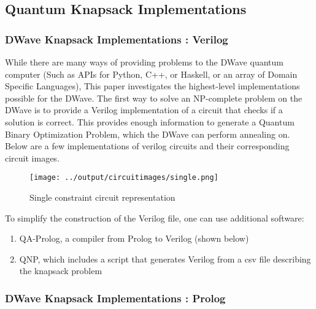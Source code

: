 \documentclass{article}
\begin{document}
\lstset{language=Python}

\newpage

\subsection{Quantum Knapsack Implementations}

\subsubsection{DWave Knapsack Implementations : Verilog}

While there are many ways of providing problems to the DWave quantum computer (Such as APIs for Python, C++, or Haskell, or an array of Domain Specific Languages), This paper investigates the highest-level implementations possible for the DWave.
The first way to solve an NP-complete problem on the DWave is to provide a Verilog implementation of a circuit that checks if a solution is correct.
This provides enough information to generate a Quantum Binary Optimization Problem, which the DWave can perform annealing on.
Below are a few implementations of verilog circuits and their corresponding circuit images.

\lstset{language=Verilog}


\newpage
\begin{figure}
  \texttt{[image: ../output/circuitimages/single.png]}
  \caption{Single constraint circuit representation}
  \label{fig:single}
\end{figure}
To simplify the construction of the Verilog file, one can use additional software:
\begin{enumerate}
    \item{QA-Prolog, a compiler from Prolog to Verilog (shown below)}
    \item{QNP, which includes a script that generates Verilog from a csv file describing the knapsack problem}
\end{enumerate}
\newpage

\subsubsection{DWave Knapsack Implementations : Prolog}
\end{document}
